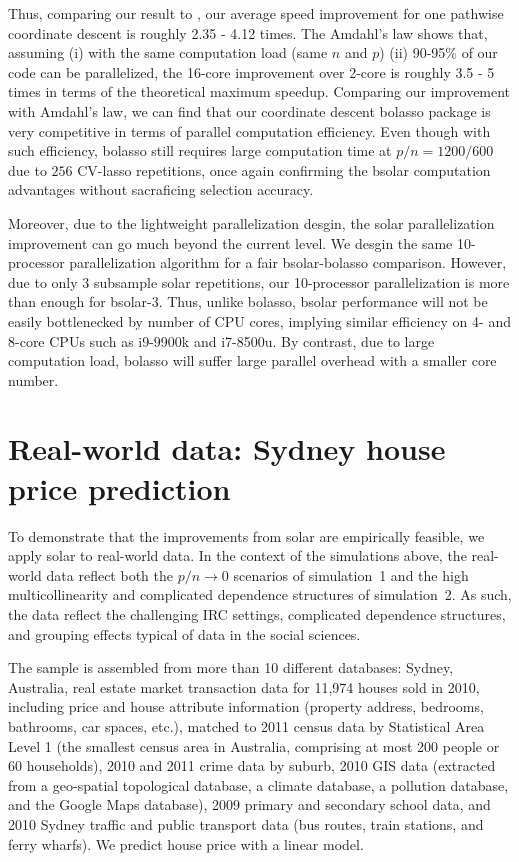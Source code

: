 \documentclass[12pt]{article}
\begin{document}
Thus, comparing our result to \citet{friedman2010regularization} , our average speed improvement for one pathwise coordinate descent is roughly 2.35 - 4.12 times. The Amdahl's law shows that, assuming (i) with the same computation load (same $n$ and $p$) (ii) 90-95\% of our code can be parallelized, the 16-core improvement over 2-core is roughly 3.5 - 5 times in terms of the theoretical maximum speedup. Comparing our improvement with Amdahl's law, we can find that our coordinate descent bolasso package is very competitive in terms of parallel computation efficiency. Even though with such efficiency, bolasso still requires large computation time at $p/n=1200/600$ due to $256$ CV-lasso repetitions, once again confirming the bsolar computation advantages without sacraficing selection accuracy.

Moreover, due to the lightweight parallelization desgin, the solar parallelization improvement can go much beyond the current level. We desgin the same 10-processor parallelization algorithm for a fair bsolar-bolasso comparison. However, due to only 3 subsample solar repetitions, our 10-processor parallelization is more than enough for bsolar-3. Thus, unlike bolasso, bsolar performance will not be easily bottlenecked by number of CPU cores, implying similar efficiency on 4- and 8-core CPUs such as i9-9900k and i7-8500u. By contrast, due to large computation load, bolasso will suffer large parallel overhead with a smaller core number.

\section{Real-world data: Sydney house price prediction\label{section:application}}

To demonstrate that the improvements from solar are empirically feasible, we apply solar to real-world data. In the context of the simulations above, the real-world data reflect both the $p/n\rightarrow0$ scenarios of simulation~1 and the high multicollinearity and complicated dependence structures of simulation~2. As such, the data reflect the challenging IRC settings, complicated dependence structures, and grouping effects typical of data in the social sciences.

The sample is assembled from more than 10 different databases: Sydney, Australia, real estate market transaction data for 11,974 houses sold in 2010, including price and house attribute information (property address, bedrooms, bathrooms, car spaces, etc.), matched to 2011 census data by Statistical Area Level 1 (the smallest census area in Australia, comprising at most 200 people or 60 households), 2010 and 2011 crime data by suburb, 2010 GIS data (extracted from a geo-spatial topological database, a climate database, a pollution database, and the Google Maps database), 2009 primary and secondary school data, and 2010 Sydney traffic and public transport data (bus routes, train stations, and ferry wharfs). We predict house price with a linear model.
\end{document}
